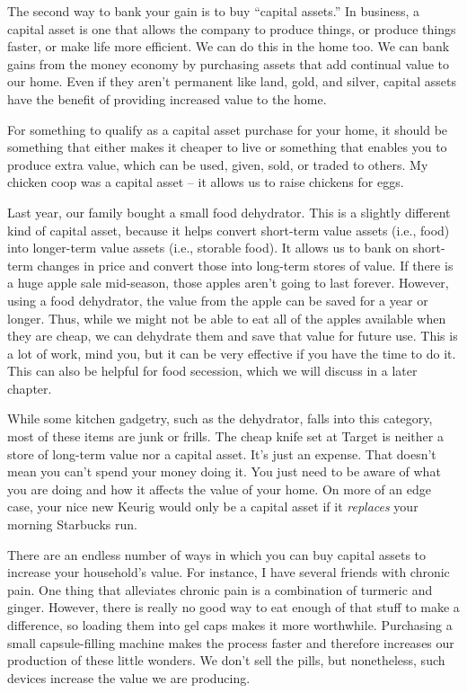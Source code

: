 The second way to bank your gain is to buy “capital assets.”  In
business, a capital asset is one that allows the company to produce
things, or produce things faster, or make life more efficient. We can
do this in the home too. We can bank gains from the money economy by
purchasing assets that add continual value to our home. Even if they
aren’t permanent like land, gold, and silver, capital assets have the
benefit of providing increased value to the home. 

For something to qualify as a capital asset purchase for your home, it
should be something that either makes it cheaper to live or something
that enables you to produce extra value, which can be used, given,
sold, or traded to others. My chicken coop was a capital asset – it
allows us to raise chickens for eggs. 

Last year, our family bought a small food dehydrator. This is a slightly
different kind of capital asset, because it helps convert short-term
value assets (i.e., food) into longer-term value assets (i.e., storable
food). It allows us to bank on short-term changes in price and convert
those into long-term stores of value. If there is a huge apple sale
mid-season, those apples aren’t going to last forever. However, using a
food dehydrator, the value from the apple can be saved for a year or
longer. Thus, while we might not be able to eat all of the apples
available when they are cheap, we can dehydrate them and save that
value for future use. This is a lot of work, mind you, but it can be
very effective if you have the time to do it. This can also be helpful
for food secession, which we will discuss in a later chapter.

While some kitchen
gadgetry, such as the
dehydrator, falls into this category, most of these items are junk or
frills. The cheap knife set at Target is neither a store of long-term
value nor a capital asset. It’s just an expense. That doesn’t mean you
can’t spend your money doing it. You just need to be aware of what you
are doing and how it affects the value of your home. On more of an edge
case, your nice new Keurig would only be a capital asset if it
\textit{replaces} your morning Starbucks run.

There are an endless
number of ways in which you can buy capital assets to increase your
household’s value. For instance, I have several friends with chronic
pain. One thing that alleviates chronic pain is a combination of
turmeric and ginger. However, there is really no good way to eat enough
of that stuff to make a difference, so loading them into gel caps makes
it more worthwhile. Purchasing a small capsule-filling machine makes
the process faster and therefore increases our production of these
little wonders. We don’t sell the pills, but nonetheless, such devices
increase the value we are producing.

